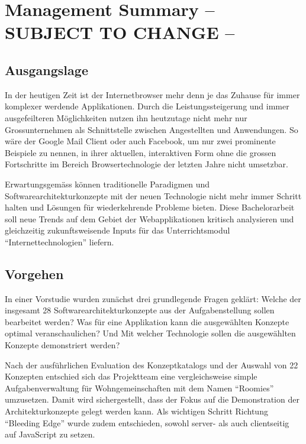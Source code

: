 \chapter{Management Summary  -- SUBJECT TO CHANGE --}

\section{Ausgangslage}
In der heutigen Zeit ist der Internetbrowser mehr denn je das Zuhause für immer komplexer werdende Applikationen. Durch die Leistungssteigerung und immer ausgefeilteren Möglichkeiten nutzen ihn heutzutage nicht mehr nur Grossunternehmen als Schnittstelle zwischen Angestellten und Anwendungen. So wäre der Google Mail Client oder auch Facebook, um nur zwei prominente Beispiele zu nennen, in ihrer aktuellen, interaktiven Form ohne die grossen Fortschritte im Bereich Browsertechnologie der letzten Jahre nicht umsetzbar.

Erwartungsgemäss können traditionelle Paradigmen und Softwarearchitekturkonzepte mit der neuen Technologie nicht mehr immer Schritt halten und Lösungen für wiederkehrende Probleme bieten. Diese Bachelorarbeit soll neue Trends auf dem Gebiet der Webapplikationen kritisch analysieren und gleichzeitig zukunftsweisende Inputs für das Unterrichtsmodul ``Internettechnologien'' liefern.

\section{Vorgehen}
In einer Vorstudie wurden zunächst drei grundlegende Fragen geklärt: Welche der insgesamt 28 Softwarearchitekturkonzepte aus der Aufgabenstellung sollen bearbeitet werden? Was für eine Applikation kann die ausgewählten Konzepte optimal veranschaulichen? Und Mit welcher Technologie sollen die ausgewählten Konzepte demonstriert werden?

Nach der ausführlichen Evaluation des Konzeptkatalogs und der Auswahl von 22 Konzepten entschied sich das Projektteam eine vergleichsweise simple Aufgabenverwaltung für Wohngemeinschaften mit dem Namen ``Roomies'' umzusetzen. Damit wird sichergestellt, dass der Fokus auf die Demonstration der Architekturkonzepte gelegt werden kann. Als wichtigen Schritt Richtung ``Bleeding Edge'' wurde zudem entschieden, sowohl server- als auch clientseitig auf JavaScript zu setzen.

